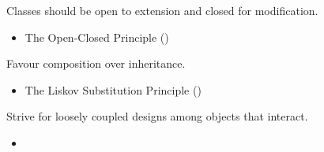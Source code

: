 \documentclass{beamer}
\begin{document}
\begin{frame}{Classes should be open to extension and closed for modification.}
    \begin{itemize}
        \item The Open-Closed Principle ()
    \end{itemize}
\end{frame}

\begin{frame}{Favour composition over inheritance.}
    \begin{itemize}
        \item The Liskov Substitution Principle ()
    \end{itemize}
\end{frame}

\begin{frame}{Strive for loosely coupled designs among objects that interact.}
    \begin{itemize}
        \item
    \end{itemize}
\end{frame}
\end{document}
